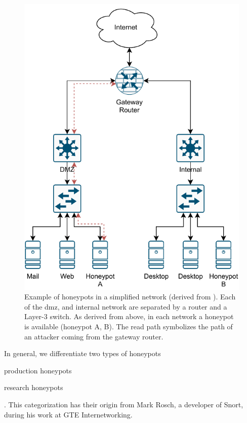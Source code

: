 \begin{figure}[ht]
    \centering
    \includegraphics{figures/honeypot-example.pdf}
    \caption[Example of honeypots in a simplified network]{Example of honeypots in a simplified network (derived from \cite{Spitzner2003}). Each of the \ac{dmz}, and internal network are separated by a router and a Layer-3 switch. As derived from above, in each network a honeypot is available (honeypot A, B). The read path symbolizes the path of an attacker coming from the gateway router.}
    \label{fig:honeypot-example}
\end{figure}

In general, we differentiate two types of honeypots
\begin{enumerate*}[label=(\roman*)]
    \item production honeypots
    \item research honeypots
\end{enumerate*}.
This categorization has their origin from Mark Rosch, a developer of Snort, during his work at GTE Internetworking.

